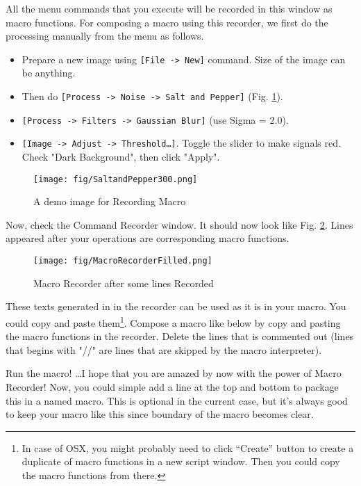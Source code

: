 \documentclass[11pt,a4paper,oneside]{report}
\newcommand{\ijmenu}[1]{\texttt{\small#1}}
\begin{document}
All the menu commands that you execute will be recorded in this window as macro functions. 
For composing a macro using this recorder, we first do the processing
manually from the menu as follows. 
\begin{itemize}
  \item Prepare a new image using \ijmenu{[File -> New]} command. Size of the
  image can be anything.
  \item Then do \ijmenu{[Process -> Noise -> Salt and Pepper]} (Fig.
  \ref{fig_SaltAndPepper}).
  \item \ijmenu{[Process -> Filters -> Gaussian Blur]} (use Sigma = 2.0).
  \item \ijmenu{[Image -> Adjust -> Threshold\ldots]}. Toggle the slider to make
  signals red. Check "Dark Background", then click "Apply".
\end{itemize}
 
\begin{figure}[htbp]
\begin{center}
\texttt{[image: fig/SaltandPepper300.png]}
\caption{A demo image for Recording Macro} 
\label{fig_SaltAndPepper}
\end{center}
\end{figure}

Now, check the Command Recorder window. 
It should now look like Fig. \ref{fig_macroRecorderFilled}. 
Lines appeared after your operations are corresponding macro functions.

\begin{figure}[htbp]
\begin{center}
\texttt{[image: fig/MacroRecorderFilled.png]}
\caption{Macro Recorder after some lines Recorded} 
\label{fig_macroRecorderFilled}
\end{center}
\end{figure}

These texts generated in in the recorder can be used as it is in your macro. 
You could copy and paste them\footnote{In case of OSX, you might probably need
to click ``Create'' button to create a duplicate of macro functions in a new script
window. Then you could copy the macro functions from there.}. Compose a macro like
below by copy and pasting the macro functions in the recorder. 
Delete the lines that is commented out (lines that begins with "//" are lines that are skipped by the macro interpreter).



Run the macro! \ldots I hope that you are amazed by now with the power of Macro
Recorder! Now, you could simple add a line at the top and bottom to package this in a named macro. This is optional in the current case, but it's always good to keep your macro like this since boundary of the macro becomes clear. 
\end{document}
